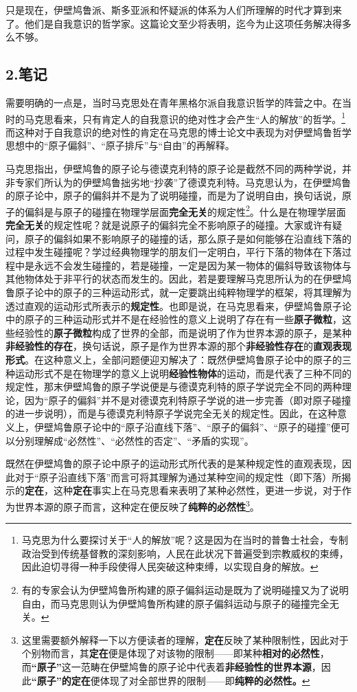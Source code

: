 \documentclass[a4paper,twoside,12pt]{ctexart}
\begin{document}
只是现在，伊壁鸠鲁派、斯多亚派和怀疑派的体系为人们所理解的时代才算到来了。他们是自我意识的哲学家。这篇论文至少将表明，迄今为止这项任务解决得多么不够。

\newpage
\subsection{2.笔记}
需要明确的一点是，当时马克思处在青年黑格尔派自我意识哲学的阵营之中。在当时的马克思看来，只有肯定人的自我意识的绝对性才会产生“人的解放”的哲学。\footnote{马克思为什么要探讨关于“人的解放”呢？这是因为在当时的普鲁士社会，专制政治受到传统基督教的深刻影响，人民在此状况下普遍受到宗教威权的束缚，因此迫切寻得一种手段使得人民突破这种束缚，以实现自身的解放。}而这种对于自我意识的绝对性的肯定在马克思的博士论文中表现为对伊壁鸠鲁哲学思想中的“原子偏斜”、“原子排斥”与“自由”的再解释。

马克思指出，伊壁鸠鲁的原子论与德谟克利特的原子论是截然不同的两种学说，并非专家们所认为的伊壁鸠鲁拙劣地“抄袭”了德谟克利特。马克思认为，在伊壁鸠鲁的原子论中，原子的偏斜并不是为了说明碰撞，而是为了说明自由，换句话说，原子的偏斜是与原子的碰撞在物理学层面\textbf{完全无关}的规定性\footnote{有的专家会认为伊壁鸠鲁所构建的原子偏斜运动是既为了说明碰撞又为了说明自由，而马克思则认为伊壁鸠鲁所构建的原子偏斜运动与原子的碰撞完全无关。}。什么是在物理学层面\textbf{完全无关}的规定性呢？就是说原子的偏斜完全不影响原子的碰撞。大家或许有疑问，原子的偏斜如果不影响原子的碰撞的话，那么原子是如何能够在沿直线下落的过程中发生碰撞呢？学过经典物理学的朋友们一定明白，平行下落的物体在下落过程中是永远不会发生碰撞的，若是碰撞，一定是因为某一物体的偏斜导致该物体与其他物体处于非平行的状态而发生的。因此，若是要理解马克思所认为的在伊壁鸠鲁原子论中的原子的三种运动形式，就一定要跳出纯粹物理学的框架，将其理解为透过直观的运动形式所表示的\textbf{规定性}。也即是说，在马克思看来，伊壁鸠鲁原子论中的原子的三种运动形式并不是在经验性的意义上说明了存在有一些\textbf{原子微粒}，这些经验性的\textbf{原子微粒}构成了世界的全部，而是说明了作为世界本源的原子，是某种\textbf{非经验性的存在}，换句话说，原子是作为世界本源的那个\textbf{非经验性存在}的\textbf{直观表现形式}。在这种意义上，全部问题便迎刃解决了：既然伊壁鸠鲁原子论中的原子的三种运动形式不是在物理学的意义上说明\textbf{经验性物体}的运动，而是代表了三种不同的规定性，那末伊壁鸠鲁的原子学说便是与德谟克利特的原子学说完全不同的两种理论，因为“原子的偏斜”并不是对德谟克利特原子学说的进一步完善（即对原子碰撞的进一步说明），而是与德谟克利特原子学说完全无关的规定性。因此，在这种意义上，伊壁鸠鲁原子论中的“原子沿直线下落”、“原子的偏斜”、“原子的碰撞”便可以分别理解成“必然性”、“必然性的否定”、“矛盾的实现”。

既然在伊壁鸠鲁的原子论中原子的运动形式所代表的是某种规定性的直观表现，因此对于“原子沿直线下落”而言可将其理解为通过某种空间的规定性（即下落）所揭示的\textbf{定在}，这种\textbf{定在}事实上在马克思看来表明了某种必然性，更进一步说，对于作为世界本源的原子而言，这种定在便反映了\textbf{纯粹的必然性}\footnote{这里需要额外解释一下以方便读者的理解，\textbf{定在}反映了某种限制性，因此对于个别物而言，其\textbf{定在}便是体现了对该物的限制——即某种\textbf{相对的必然性}，而\textbf{“原子”}这一范畴在伊壁鸠鲁的原子论中代表着\textbf{非经验性的世界本源}，因此\textbf{“原子”的定在}便体现了对全部世界的限制——即\textbf{纯粹的必然性。}}。
\end{document}
